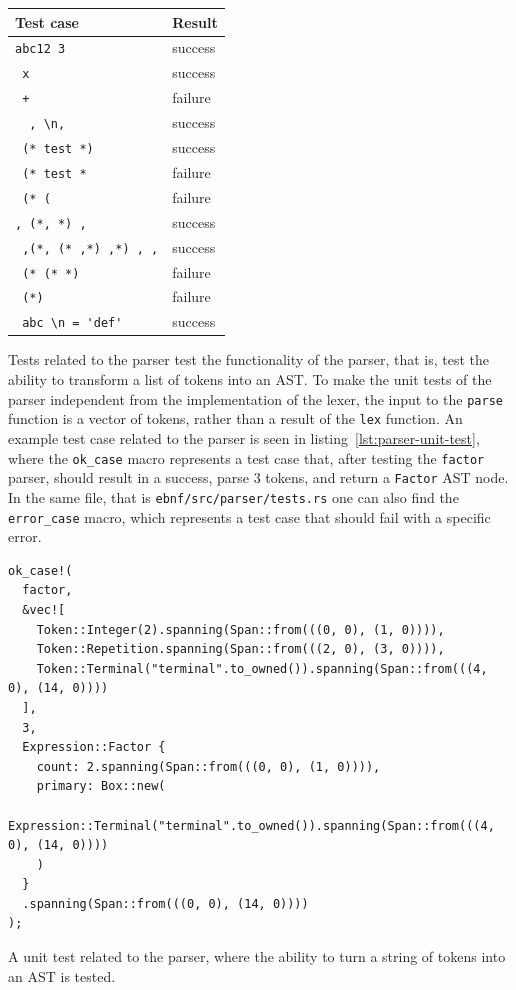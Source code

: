 \documentclass[english,engineering]{wizthesis}
\begin{document}
\begin{table}[H]
\begin{tabular}{@{}ll@{}}
  \end{tabular}
  \hspace{0.5cm}
  \begin{tabular}{@{}ll@{}}
    \toprule
    Test case & Result \\ \midrule
    \verb*@abc12 3 @             & success \\
    \verb*@ x @                  & success \\
    \verb*@ + @                  & failure \\
    \verb*@  , \n,@              & success \\
    \verb*@ (* test *) @         & success \\
    \verb*@ (* test * @          & failure \\
    \verb*@ (* (@                & failure \\
    \verb*@, (*, *) , @          & success \\
    \verb*@ ,(*, (* ,*) ,*) , ,@ & success \\
    \verb*@ (* (* *) @           & failure \\
    \verb*@ (*) @                & failure \\
    \verb*@ abc \n = 'def' @     & success \\ \bottomrule
  \end{tabular}
\end{table}

Tests related to the parser test the functionality of the parser, that is, test
the ability to transform a list of tokens into an AST. To make the unit tests of
the parser independent from the implementation of the lexer, the input to the
\texttt{parse} function is a vector of tokens, rather than a result of the
\texttt{lex} function. An example test case related to the parser is seen in
listing~\ref{lst:parser-unit-test}, where the \texttt{ok\_case} macro represents
a test case that, after testing the \texttt{factor} parser, should result in a
success, parse 3 tokens, and return a \texttt{Factor} AST node. In the same
file, that is \texttt{ebnf/src/parser/tests.rs} one can also find the
\texttt{error\_case} macro, which represents a test case that should fail with a
specific error.

\begin{listing}[H]
  \begin{verbatim}
ok_case!(
  factor,
  &vec![
    Token::Integer(2).spanning(Span::from(((0, 0), (1, 0)))),
    Token::Repetition.spanning(Span::from(((2, 0), (3, 0)))),
    Token::Terminal("terminal".to_owned()).spanning(Span::from(((4, 0), (14, 0))))
  ],
  3,
  Expression::Factor {
    count: 2.spanning(Span::from(((0, 0), (1, 0)))),
    primary: Box::new(
      Expression::Terminal("terminal".to_owned()).spanning(Span::from(((4, 0), (14, 0))))
    )
  }
  .spanning(Span::from(((0, 0), (14, 0))))
);
  \end{verbatim}
  \caption{A unit test related to the parser, where the ability to turn a string
  of tokens into an AST is tested.}
  \label{lst:parser-unit-test}
\end{listing}
\end{document}
